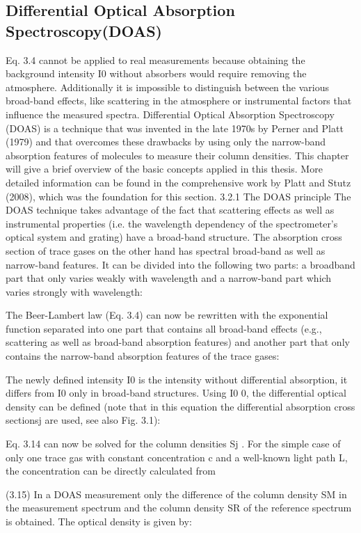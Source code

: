 \documentclass  [
  paper    = a4,
  BCOR     = 10mm,
  twoside,
  fontsize = 12pt,
  fleqn,
  toc      = bibnumbered,
  toc      = listofnumbered,
  numbers  = noendperiod,
  headings = normal,
  listof   = leveldown,
  version  = 3.03
]                                       {scrreprt}
\begin{document}
	\subsection{Differential Optical Absorption Spectroscopy(DOAS)\label{DOAS}}
	Eq. 3.4 cannot be applied to real measurements because obtaining the background
	intensity I0 without absorbers would require removing the atmosphere.
	Additionally it is impossible to distinguish between the various broad-band
	effects, like scattering in the atmosphere or instrumental factors that influence
	the measured spectra. Differential Optical Absorption Spectroscopy (DOAS)
	is a technique that was invented in the late 1970s by Perner and Platt (1979)
	and that overcomes these drawbacks by using only the narrow-band absorption
	features of molecules to measure their column densities. This chapter will give
	a brief overview of the basic concepts applied in this thesis. More detailed
	information can be found in the comprehensive work by Platt and Stutz (2008),
	which was the foundation for this section.
	3.2.1 The DOAS principle
	The DOAS technique takes advantage of the fact that scattering effects as well
	as instrumental properties (i.e. the wavelength dependency of the spectrometer’s
	optical system and grating) have a broad-band structure. The absorption cross
	section of trace gases on the other hand has spectral broad-band as well as narrow-band features. It can be divided into the following two parts: a broadband
	part  that only varies weakly with wavelength and a narrow-band
	part which varies strongly with wavelength:

	The Beer-Lambert law (Eq. 3.4) can now be rewritten with the exponential
	function separated into one part that contains all broad-band effects (e.g.,
	scattering as well as broad-band absorption features) and another part that only
	contains the narrow-band absorption features of the trace gases:

	The newly defined intensity I0
is the intensity without differential absorption,
	it differs from I0 only in broad-band structures. Using I0
	0, the differential
	optical density can be defined (note that in this equation the differential
	absorption cross sectionsj are used, see also Fig. 3.1):

	Eq. 3.14 can now be solved for the column densities Sj . For the simple case of
	only one trace gas with constant concentration c and a well-known light path L,
	the concentration can be directly calculated from 

	(3.15)
	In a DOAS measurement only the difference of the column density SM in the
	measurement spectrum  and the column density SR of the
	reference spectrum  is obtained. The optical density is given
	by:
\end{document}
